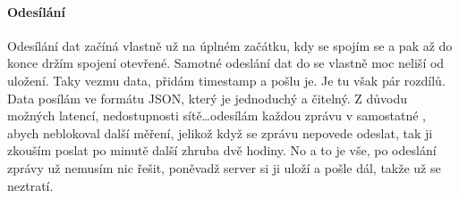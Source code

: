\paragraph*{Odesílání}
Odesílání dat začíná vlastně už na úplném začátku, kdy se spojím se  a pak až do konce držím 
spojení otevřené. Samotné odeslání dat do  se vlastně moc neliší od uložení. 
Taky vezmu data, přidám \gls{timestamp} a pošlu je. Je tu však pár rozdílů. Data posílám ve formátu \gls{JSON}, který je 
jednoduchý a čitelný. Z důvodu možných latencí, nedostupnosti sítě\ldots odesílám každou zprávu v samostatné 
, abych neblokoval další měření, jelikož když se zprávu nepovede odeslat, tak ji zkouším 
poslat po minutě další zhruba dvě hodiny. No a to je vše, po odeslání zprávy už nemusím nic řešit, poněvadž server si ji 
uloží a pošle dál, takže už se neztratí.
